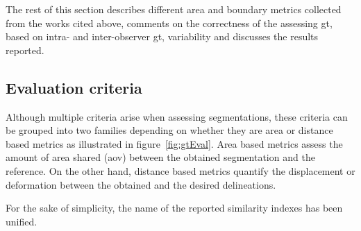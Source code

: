 \documentclass[authoryear,preprint,review,12pt]{elsarticle}
\begin{document}
The rest of this section describes different area and boundary metrics collected from the works cited above,  comments on the correctness of the assessing \ac{gt}, based on intra- and inter-observer \ac{gt}, variability and discusses the results reported.

\subsection{Evaluation criteria}\label{section:evalCriteria}
Although multiple criteria arise when assessing segmentations, these criteria can be grouped into two families depending on whether they are area or distance based metrics as illustrated in figure~\ref{fig:gtEval}. Area based metrics assess the amount of area shared (\acf{aov}) between the obtained segmentation and the reference. On the other hand, distance based metrics quantify the displacement or deformation between the obtained and the desired delineations. 

For the sake of simplicity, the name of the reported similarity indexes has been unified.
\end{document}
